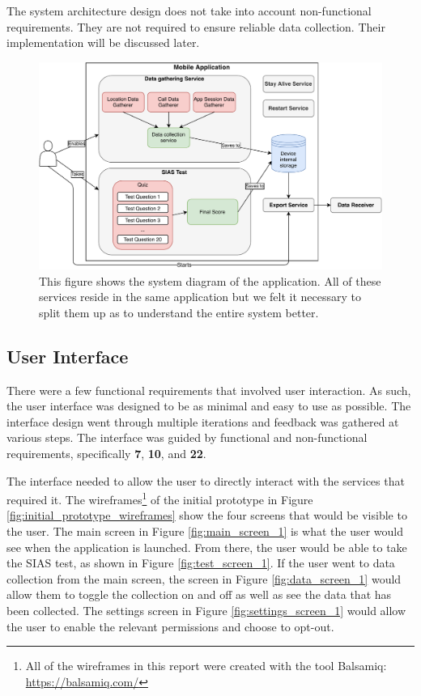 \documentclass{l4proj}
\begin{document}
The system architecture design does not take into account non-functional requirements. They are not required to ensure reliable data collection. Their implementation will be discussed later.

\begin{figure}[!htb]
    \centering
    \includegraphics[width=0.95\linewidth]{images/app_system_diagram.pdf}    
    \caption{This figure shows the system diagram of the application. All of these services reside in the same application but we felt it necessary to split them up as to understand the entire system better.}
    \label{fig:app_system_diagram} 
\end{figure}
\FloatBarrier

\subsection{User Interface}
There were a few functional requirements that involved user interaction. As such, the user interface was designed to be as minimal and easy to use as possible. The interface design went through multiple iterations and feedback was gathered at various steps. The interface was guided by functional and non-functional requirements, specifically \textbf{7}, \textbf{10}, and \textbf{22}.

The interface needed to allow the user to directly interact with the services that required it. The wireframes\footnote{All of the wireframes in this report were created with the tool Balsamiq:  \url{https://balsamiq.com/}} of the initial prototype in Figure \ref{fig:initial_prototype_wireframes} show the four screens that would be visible to the user. The main screen in Figure \ref{fig:main_screen_1} is what the user would see when the application is launched. From there, the user would be able to take the SIAS test, as shown in Figure \ref{fig:test_screen_1}. If the user went to data collection from the main screen, the screen in Figure \ref{fig:data_screen_1} would allow them to toggle the collection on and off as well as see the data that has been collected. The settings screen in Figure \ref{fig:settings_screen_1} would allow the user to enable the relevant permissions and choose to opt-out.
\end{document}
